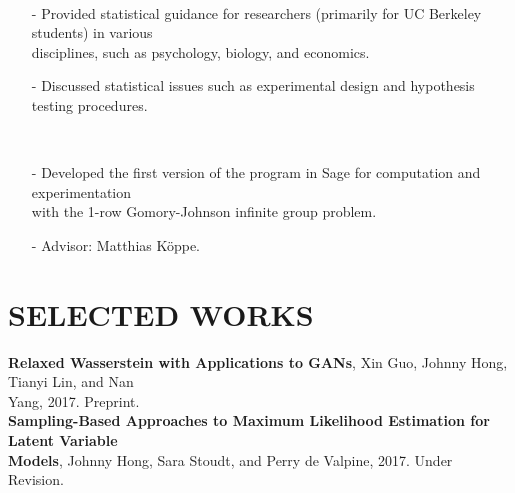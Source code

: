 \documentclass{res}
\begin{document}
\begin{resume}
     \\ 
    \begin{itemize}
     \item[-] Provided statistical guidance for researchers (primarily for UC Berkeley students) in various \\disciplines, such as psychology, biology, and economics.
     \item[-] Discussed statistical issues such as experimental design and hypothesis testing procedures.    
    \end{itemize}        
    
     \\ 
        \begin{itemize}
        \item[-] Developed the first version of the program in Sage for computation and experimentation
       \\with the 1-row Gomory-Johnson infinite group problem.
       \item[-] Advisor: Matthias K\"{o}ppe.
        \end{itemize}
%    

\section{SELECTED WORKS}
\textbf{Relaxed Wasserstein with Applications to GANs}, Xin Guo, Johnny Hong, Tianyi Lin, and Nan \\Yang, 2017. Preprint.
\\
\textbf{Sampling-Based Approaches to Maximum Likelihood Estimation for Latent Variable \\Models}, Johnny Hong, Sara Stoudt, and Perry de Valpine, 2017. Under Revision.


\end{resume}
\end{document}
